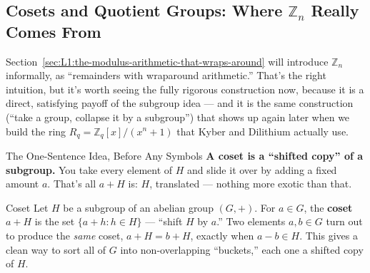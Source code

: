 \subsection{Cosets and Quotient Groups: Where $\mathbb{Z}_n$ Really Comes From}
\label{sec:L1:cosets-and-quotient-groups-where-really}

Section~\ref{sec:L1:the-modulus-arithmetic-that-wraps-around} will introduce $\mathbb{Z}_n$ informally, as ``remainders with wraparound arithmetic.'' That's the right intuition, but it's worth seeing the fully rigorous construction now, because it is a direct, satisfying payoff of the subgroup idea --- and it is the same construction (``take a group, collapse it by a subgroup'') that shows up again later when we build the ring $R_q = \mathbb{Z}_q[x]/(x^n+1)$ that Kyber and Dilithium actually use.

\begin{rmkbox}{The One-Sentence Idea, Before Any Symbols}
\textbf{A coset is a ``shifted copy'' of a subgroup.} You take every element of $H$ and slide it over by adding a fixed amount $a$. That's all $a+H$ is: $H$, translated --- nothing more exotic than that.
\end{rmkbox}

\begin{defbox}{Coset}
Let $H$ be a subgroup of an abelian group $(G,+)$. For $a \in G$, the \textbf{coset} $a + H$ is the set $\{a + h : h \in H\}$ --- ``shift $H$ by $a$.'' Two elements $a,b \in G$ turn out to produce the \emph{same} coset, $a+H = b+H$, exactly when $a - b \in H$. This gives a clean way to sort all of $G$ into non-overlapping ``buckets,'' each one a shifted copy of $H$.
\end{defbox}

